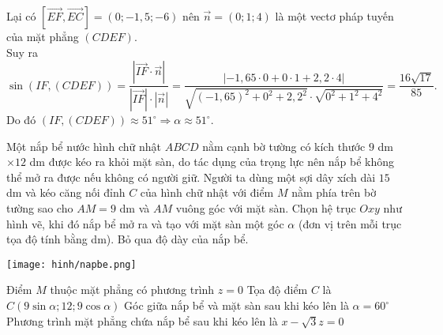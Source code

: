 \begin{ex}
{	Lại có $\left[\overrightarrow{EF}, \overrightarrow{EC}\right]=(0; -1{,}5; -6)$ nên $\overrightarrow{n}=(0; 1; 4)$ là một vectơ pháp tuyến của mặt phẳng $(CDEF)$.\\
	Suy ra
	\[\sin\left(IF, (CDEF)\right)=\dfrac{\left|\overrightarrow{IF}\cdot \overrightarrow{n}\right|}{\left|\overrightarrow{IF}\right|\cdot \left|\overrightarrow{n}\right|}=\dfrac{\left|-1{,}65\cdot 0+0\cdot 1+2{,}2\cdot4\right|}{\sqrt{(-1{,}65)^2+0^2+2{,}2^2}\cdot\sqrt{0^2+1^2+4^2}}=\dfrac{16\sqrt{17}}{85}.\]
	Do đó $\left(IF, (CDEF)\right)\approx 51^\circ\Rightarrow \alpha\approx 51^\circ$.
	}
\end{ex}

\begin{ex}%
	Một nắp bể nước hình chữ nhật $ABCD$ nằm cạnh bờ tường có kích thước $9$ dm $\times 12$ dm được kéo ra khỏi mặt sàn, do tác dụng của trọng lực nên nắp bể không thể mở ra được nếu không có người giữ. Người ta dùng một sợi dây xích dài $15$ dm và kéo căng nối đỉnh $C$ của hình chữ nhật với điểm $M$ nằm phía trên bờ tường sao cho $AM = 9$ dm và $AM$ vuông góc với mặt sàn. Chọn hệ trục $Oxy$ như hình vẽ, khi đó nắp bể mở ra và tạo với mặt sàn một góc $\alpha$ (đơn vị trên mỗi trục tọa độ tính bằng dm). Bỏ qua độ dày của nắp bể.
	\begin{center}
		\texttt{[image: hinh/napbe.png]}
	\end{center}
	\choiceTF
	{Điểm $M$ thuộc mặt phẳng có phương trình $z = 0$}
	{Tọa độ điểm $C$ là $C(9 \sin \alpha; 12; 9 \cos \alpha)$}
	{Góc giữa nắp bể và mặt sàn sau khi kéo lên là $\alpha = 60^\circ$}
	{\True Phương trình mặt phẳng chứa nắp bể sau khi kéo lên là $x - \sqrt{3} z = 0$}
\end{ex}
